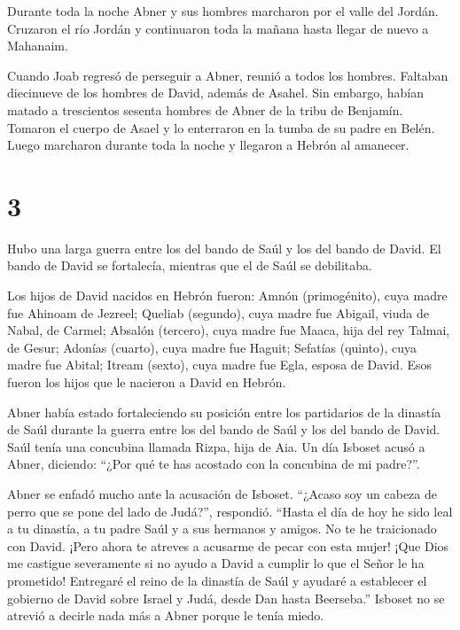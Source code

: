  Durante toda la noche Abner y sus hombres marcharon por el
valle del Jordán. Cruzaron el río Jordán y continuaron toda la mañana
hasta llegar de nuevo a Mahanaim.

 Cuando Joab regresó de perseguir a Abner, reunió a todos
los hombres. Faltaban diecinueve de los hombres de David, además de
Asahel.  Sin embargo, habían matado a trescientos sesenta
hombres de Abner de la tribu de Benjamín.  Tomaron el
cuerpo de Asael y lo enterraron en la tumba de su padre en Belén. Luego
marcharon durante toda la noche y llegaron a Hebrón al amanecer.

\hypertarget{section-2}{%
\section{3}\label{section-2}}

 Hubo una larga guerra entre los del bando de Saúl y los del
bando de David. El bando de David se fortalecía, mientras que el de Saúl
se debilitaba.

 Los hijos de David nacidos en Hebrón fueron: Amnón
(primogénito), cuya madre fue Ahinoam de Jezreel;  Queliab
(segundo), cuya madre fue Abigail, viuda de Nabal, de Carmel; Absalón
(tercero), cuya madre fue Maaca, hija del rey Talmai, de Gesur;
 Adonías (cuarto), cuya madre fue Haguit; Sefatías (quinto),
cuya madre fue Abital;  Itream (sexto), cuya madre fue Egla,
esposa de David. Esos fueron los hijos que le nacieron a David en
Hebrón.

 Abner había estado fortaleciendo su posición entre los
partidarios de la dinastía de Saúl durante la guerra entre los del bando
de Saúl y los del bando de David.  Saúl tenía una concubina
llamada Rizpa, hija de Aia. Un día Isboset acusó a Abner, diciendo:
``¿Por qué te has acostado con la concubina de mi padre?''.

 Abner se enfadó mucho ante la acusación de Isboset.
``¿Acaso soy un cabeza de perro que se pone del lado de Judá?'',
respondió. ``Hasta el día de hoy he sido leal a tu dinastía, a tu padre
Saúl y a sus hermanos y amigos. No te he traicionado con David. ¡Pero
ahora te atreves a acusarme de pecar con esta mujer!  ¡Que
Dios me castigue severamente si no ayudo a David a cumplir lo que el
Señor le ha prometido!  Entregaré el reino de la dinastía
de Saúl y ayudaré a establecer el gobierno de David sobre Israel y Judá,
desde Dan hasta Beerseba.''  Isboset no se atrevió a
decirle nada más a Abner porque le tenía miedo.

